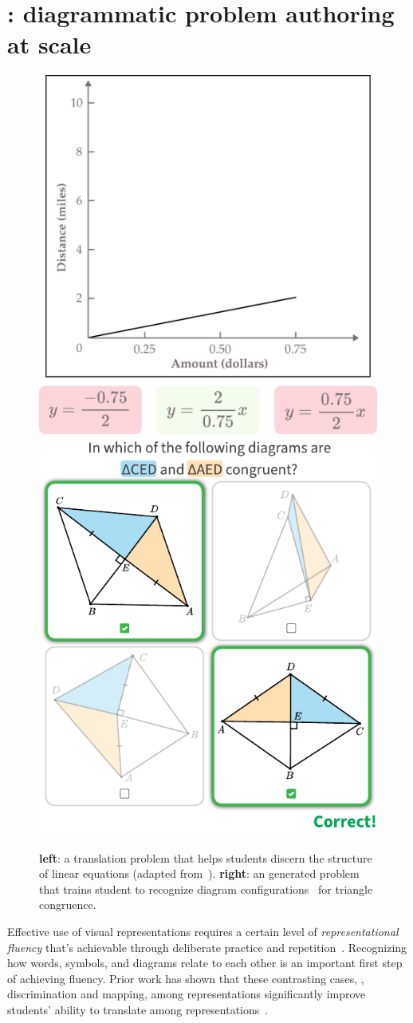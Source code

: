 \chapter{\Edgeworth: diagrammatic problem authoring at scale}
\label{chp:edgeworth}

\begin{figure}[h]
    \centering
    \includegraphics[width=0.45\linewidth]{assets/chapter-3/translation-problem.pdf}
    \hspace{5pt}
    \includegraphics[width=0.45\linewidth]{assets/chapter-3/edgeworth-problem.pdf}
    \caption{\textbf{left}: a translation problem that helps students discern the structure of linear equations (adapted from~\cite{perceptualLearning}). \textbf{right}: an \Edgeworth generated problem that trains student to recognize diagram configurations~\cite{Koedinger1990a} for triangle congruence.}
    \label{fig:translation-problem}
\end{figure}

\vspace{10pt}

Effective use of visual representations requires a certain level of \emph{representational fluency} that's achievable through deliberate practice and repetition~\cite{metarepresentation, representationalFluency}. Recognizing how words, symbols, and diagrams relate to each other is an important first step of achieving fluency. Prior work has shown that these contrasting cases, \ie, discrimination and mapping, among representations significantly improve students' ability to translate among representations~\cite{perceptualLearning}.

